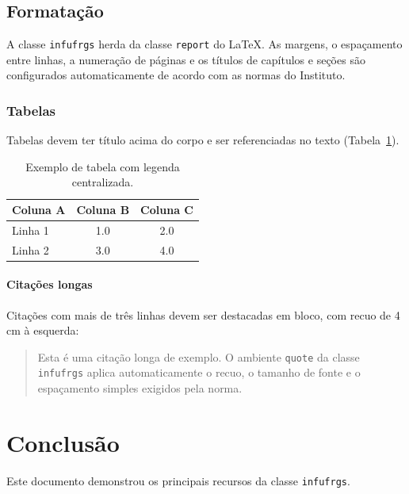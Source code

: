 \documentclass[ppgc,diss,english]{infufrgs}
\begin{document}
\section{Formatação}

A classe \texttt{infufrgs} herda da classe \texttt{report} do \LaTeX.  As
margens, o espaçamento entre linhas, a numeração de páginas e os títulos de
capítulos e seções são configurados automaticamente de acordo com as normas
do Instituto.

\subsection{Tabelas}

Tabelas devem ter título acima do corpo e ser referenciadas no texto
(Tabela~\ref{tab:exemplo}).

\begin{table}[htbp]
  \centering
  \caption{Exemplo de tabela com legenda centralizada.}
  \label{tab:exemplo}
  \begin{tabular}{lcc}
    \hline
    \textbf{Coluna A} & \textbf{Coluna B} & \textbf{Coluna C} \\
    \hline
    Linha 1 & 1.0 & 2.0 \\
    Linha 2 & 3.0 & 4.0 \\
    \hline
  \end{tabular}
\end{table}

\subsubsection{Citações longas}

Citações com mais de três linhas devem ser destacadas em bloco, com recuo de
4\,cm à esquerda:

\begin{quote}
  Esta é uma citação longa de exemplo.  O ambiente \texttt{quote} da classe
  \texttt{infufrgs} aplica automaticamente o recuo, o tamanho de fonte e o
  espaçamento simples exigidos pela norma.
\end{quote}

\chapter{Conclusão}
\label{cap:conclusao}

Este documento demonstrou os principais recursos da classe \texttt{infufrgs}.

\end{document}
